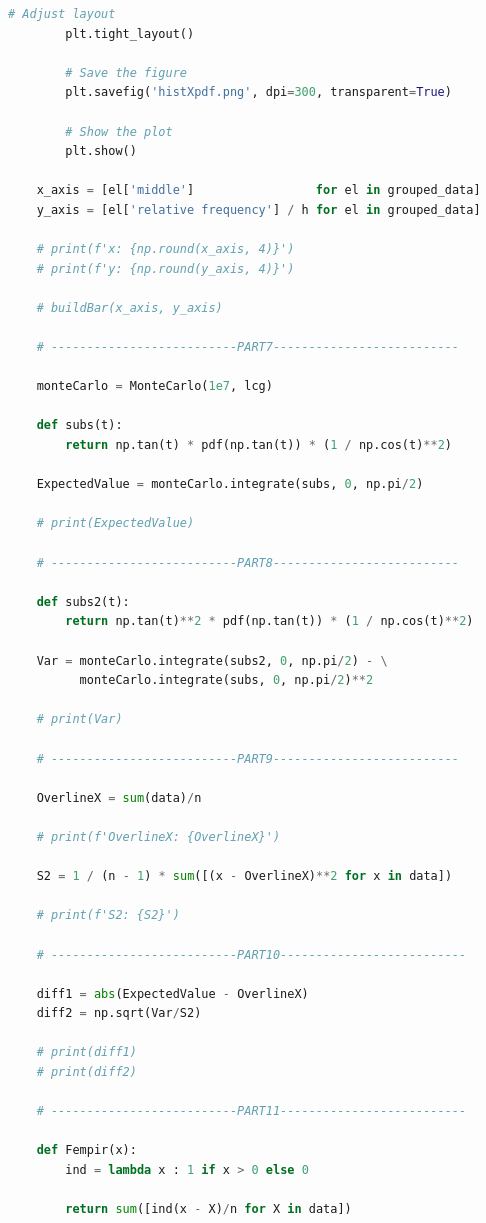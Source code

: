 \documentclass[a4paper, 14pt]{extarticle}
\begin{document}
\begin{center}
\begin{lstlisting}[language=Python]
        # Adjust layout
        plt.tight_layout()

        # Save the figure
        plt.savefig('histXpdf.png', dpi=300, transparent=True)

        # Show the plot
        plt.show()

    x_axis = [el['middle']                 for el in grouped_data]
    y_axis = [el['relative frequency'] / h for el in grouped_data]

    # print(f'x: {np.round(x_axis, 4)}')
    # print(f'y: {np.round(y_axis, 4)}')

    # buildBar(x_axis, y_axis)

    # --------------------------PART7--------------------------

    monteCarlo = MonteCarlo(1e7, lcg)

    def subs(t):
        return np.tan(t) * pdf(np.tan(t)) * (1 / np.cos(t)**2) 

    ExpectedValue = monteCarlo.integrate(subs, 0, np.pi/2)
    
    # print(ExpectedValue)

    # --------------------------PART8--------------------------

    def subs2(t):
        return np.tan(t)**2 * pdf(np.tan(t)) * (1 / np.cos(t)**2) 

    Var = monteCarlo.integrate(subs2, 0, np.pi/2) - \
          monteCarlo.integrate(subs, 0, np.pi/2)**2
    
    # print(Var)

    # --------------------------PART9--------------------------

    OverlineX = sum(data)/n

    # print(f'OverlineX: {OverlineX}')

    S2 = 1 / (n - 1) * sum([(x - OverlineX)**2 for x in data])

    # print(f'S2: {S2}')

    # --------------------------PART10--------------------------

    diff1 = abs(ExpectedValue - OverlineX)
    diff2 = np.sqrt(Var/S2)

    # print(diff1)
    # print(diff2)

    # --------------------------PART11--------------------------

    def Fempir(x):
        ind = lambda x : 1 if x > 0 else 0

        return sum([ind(x - X)/n for X in data])


\end{lstlisting}
\end{center}
\end{document}
